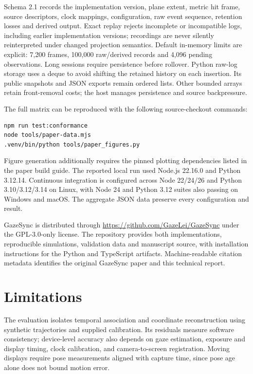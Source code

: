 \documentclass[sigconf,screen,nonacm]{acmart}
\begin{document}
Schema 2.1 records the implementation version, plane extent, metric hit frame,
source descriptors, clock
mappings, configuration, raw event sequence, retention losses and derived output.
Exact replay rejects incomplete or incompatible logs, including earlier
implementation versions; recordings are never silently reinterpreted under
changed projection semantics. Default in-memory limits
are explicit: 7,200 frames, 100,000 raw/derived records and 4,096 pending
observations. Long sessions require persistence before rollover.
Python raw-log storage uses a deque to avoid shifting the retained history on
each insertion. Its public snapshots and JSON exports remain ordered lists.
Other bounded arrays retain front-removal costs; the host manages persistence
and source backpressure.

The full matrix can be reproduced with the following source-checkout commands:
\begin{lstlisting}
npm run test:conformance
node tools/paper-data.mjs
.venv/bin/python tools/paper_figures.py
\end{lstlisting}
Figure generation additionally requires the pinned plotting dependencies listed
in the paper build guide. The reported local run used Node.js 22.16.0 and Python
3.12.14. Continuous integration is configured across Node 22/24/26 and Python
3.10/3.12/3.14 on Linux, with Node 24 and Python 3.12 suites also passing on
Windows and macOS. The aggregate JSON data preserve every configuration and result.

GazeSync is distributed through \url{https://github.com/GazeLei/GazeSync} under
the GPL-3.0-only license. The repository provides both implementations,
reproducible simulations, validation data and manuscript source, with installation
instructions for the Python and TypeScript artifacts. Machine-readable citation
metadata identifies the original GazeSync paper and this technical report.

\section{Limitations}
The evaluation isolates temporal association and coordinate reconstruction using
synthetic trajectories and supplied calibration. Its residuals measure software
consistency; device-level accuracy also depends on gaze estimation, exposure and
display timing, clock calibration, and camera-to-screen registration. Moving
displays require pose measurements aligned with capture time, since pose age
alone does not bound motion error.
\end{document}
